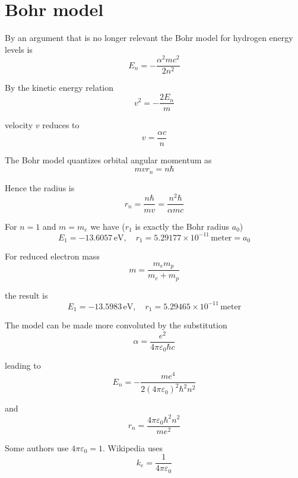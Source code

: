 


\section*{Bohr model}

By an argument that is no longer relevant the Bohr model
for hydrogen energy levels is
\begin{equation*}
E_n=-\frac{\alpha^2mc^2}{2n^2}
\end{equation*}

By the kinetic energy relation
\begin{equation*}
v^2=-\frac{2E_n}{m}
\end{equation*}

velocity $v$ reduces to
\begin{equation*}
v=\frac{\alpha c}{n}
\end{equation*}

The Bohr model quantizes orbital angular momentum as
\begin{equation*}
mvr_n=n\hbar
\end{equation*}

Hence the radius is
\begin{equation*}
r_n=\frac{n\hbar}{mv}=\frac{n^2\hbar}{\alpha mc}
\end{equation*}

For $n=1$ and $m=m_e$ we have ($r_1$ is exactly the Bohr radius $a_0$)
\begin{equation*}
E_1=-13.6057\,\text{eV},\quad
r_1=5.29177\times10^{-11}\,\text{meter}=a_0
\end{equation*}

For reduced electron mass
\begin{equation*}
m=\frac{m_em_p}{m_e+m_p}
\end{equation*}

the result is
\begin{equation*}
E_1=-13.5983\,\text{eV},\quad
r_1=5.29465\times10^{-11}\,\text{meter}
\end{equation*}

The model can be made more convoluted by the substitution
\begin{equation*}
\alpha=\frac{e^2}{4\pi\varepsilon_0\hbar c}
\end{equation*}

leading to
\begin{equation*}
E_n=-\frac{me^4}{2(4\pi\varepsilon_0)^2\hbar^2n^2}
\end{equation*}

and
\begin{equation*}
r_n=\frac{4\pi\varepsilon_0\hbar^2n^2}{me^2}
\end{equation*}

Some authors use $4\pi\varepsilon_0=1$.
Wikipedia uses
\begin{equation*}
k_e=\frac{1}{4\pi\varepsilon_0}
\end{equation*}


